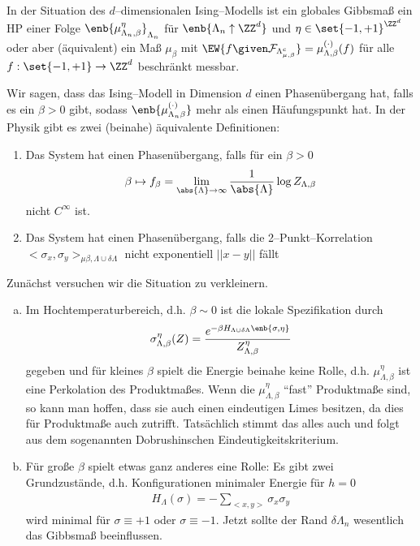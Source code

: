 	\begin{definition}
		In der Situation des $d$--dimensionalen Ising--Modells ist ein globales Gibbsmaß ein HP einer Folge $\enb{\mu^{\eta}_{\Lambda_n,\beta}}_{\Lambda_n}$ für $\enb{\Lambda_n \uparrow \ZZ^d}$ und $\eta \in \set{-1,+1}^{\ZZ^d}$ oder aber (äquivalent) ein Maß $\mu_{\beta}$ mit $\EW{f \given \mathcal{F}_{\Lambda^c_{\mu,\beta}}} = \mu_{\Lambda,\beta}^{(\cdot)} (f)$ für alle $f: \set{-1,+1} \to \ZZ^d$ beschränkt messbar.
	\end{definition}
	
\begin{definition}
	Wir sagen, dass das Ising--Modell in Dimension $d$ einen Phasenübergang hat, falls es ein $\beta > 0$ gibt, sodass $\enb{\mu^{(\cdot)}_{\Lambda_n \beta}}$ mehr als einen Häufungspunkt hat. In der Physik gibt es zwei (beinahe) äquivalente Definitionen:
	\begin{enumerate}
		\item Das System hat einen Phasenübergang, falls für ein $\beta> 0$ 
		\begin{align}
			\beta \mapsto f_{\beta} = \lim\limits_{\abs{\Lambda} \to \infty} \frac{1}{\abs{\Lambda}} \log Z_{\Lambda, \beta}
		\end{align}
		nicht $C^{\infty}$ ist.
		
		\item Das System hat einen Phasenübergang, falls die 2--Punkt--Korrelation $<\sigma_x,\sigma_y>_{\mu \beta, \Lambda \cup \delta \Lambda}$ nicht exponentiell $|| x- y||$ fällt 
	\end{enumerate}
\end{definition}
	Zunächst versuchen  wir die Situation zu verkleinern. 

\begin{enumerate}[a)]
	\item Im Hochtemperaturbereich, d.h. $\beta \sim 0$ ist die lokale Spezifikation durch 
	\begin{align}
		\sigma^{\eta}_{\Lambda, \beta} (Z) = \frac{e^{-\beta H_{\Lambda \cup \delta\Lambda} \enb{\sigma, \eta} }}{Z^{\eta}_{\Lambda, \beta} } 
	\end{align}
	gegeben und für kleines $\beta$ spielt die Energie beinahe keine Rolle, d.h.  $\mu_{\Lambda, \beta}^{\eta}$ ist eine Perkolation des Produktmaßes. 
	Wenn die $\mu_{\Lambda, \beta}^{\eta}$ \enquote{fast} Produktmaße sind, so kann man hoffen, dass sie auch einen eindeutigen Limes besitzen, da dies für Produktmaße auch zutrifft. Tatsächlich stimmt das alles auch und folgt aus dem sogenannten Dobrushinschen Eindeutigkeitskriterium. 
	
	\item Für große $\beta$ spielt etwas ganz anderes eine Rolle: Es gibt zwei Grundzustände, d.h. Konfigurationen minimaler Energie für $h = 0$
	\begin{align}
		H_{\Lambda}(\sigma) = - \sum\limits_{<x,y>} \sigma_x \sigma_y
	\end{align}
	wird minimal für $\sigma \equiv + 1$ oder $\sigma \equiv -1$. Jetzt sollte der Rand $\delta \Lambda_n$ wesentlich das Gibbsmaß beeinflussen.
\end{enumerate}

